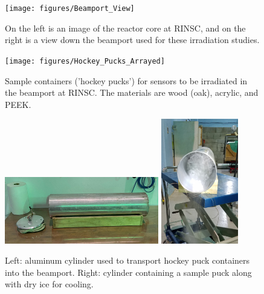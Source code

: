 \begin{figure}[!hbt]
  \begin{center}
    \texttt{[image: figures/Beamport\_View]}
    \caption{On the left is an image of the reactor core at RINSC, and on the right is a view down the beamport used for these irradiation studies.}
    \label{fig:RINSC_Facility}
  \end{center}
\end{figure}

\begin{figure}[!hbt]
  \begin{center}
    \texttt{[image: figures/Hockey\_Pucks\_Arrayed]}
    \caption{Sample containers ('hockey pucks') for sensors to be irradiated in the beamport at RINSC. The materials are wood (oak), acrylic, and PEEK.}
    \label{fig:Pucks_Arrayed}
  \end{center}
\end{figure}

\iffalse      %
\begin{figure}[!hbt]
  \begin{center}
    \includegraphics[width=0.60\textwidth]{figures/Cylinder_Side_View}
    \includegraphics[width=0.30\textwidth]{figures/Cylinder_With_Dry_Ice}
    \caption{Left: aluminum cylinder used to transport hockey puck containers into the beamport. Right: cylinder containing a sample puck along with dry ice for cooling.}
    \label{fig:Cylinder_Details}
  \end{center}
\end{figure}

